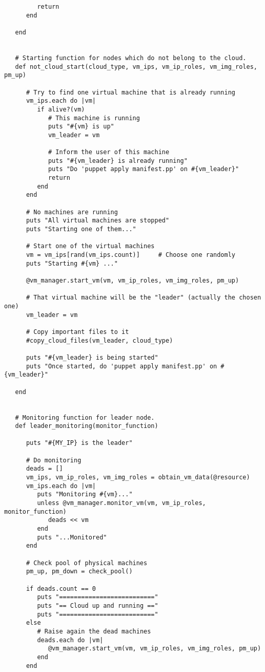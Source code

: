 \begin{lstlisting}
         return
      end

   end


   # Starting function for nodes which do not belong to the cloud.
   def not_cloud_start(cloud_type, vm_ips, vm_ip_roles, vm_img_roles, pm_up)
      
      # Try to find one virtual machine that is already running
      vm_ips.each do |vm|
         if alive?(vm)
            # This machine is running
            puts "#{vm} is up"
            vm_leader = vm

            # Inform the user of this machine
            puts "#{vm_leader} is already running"
            puts "Do 'puppet apply manifest.pp' on #{vm_leader}"
            return
         end
      end
      
      # No machines are running
      puts "All virtual machines are stopped"
      puts "Starting one of them..."
   
      # Start one of the virtual machines
      vm = vm_ips[rand(vm_ips.count)]     # Choose one randomly
      puts "Starting #{vm} ..."
      
      @vm_manager.start_vm(vm, vm_ip_roles, vm_img_roles, pm_up)
      
      # That virtual machine will be the "leader" (actually the chosen one)
      vm_leader = vm
      
      # Copy important files to it
      #copy_cloud_files(vm_leader, cloud_type)
      
      puts "#{vm_leader} is being started"
      puts "Once started, do 'puppet apply manifest.pp' on #{vm_leader}"

   end


   # Monitoring function for leader node.
   def leader_monitoring(monitor_function)

      puts "#{MY_IP} is the leader"
      
      # Do monitoring
      deads = []
      vm_ips, vm_ip_roles, vm_img_roles = obtain_vm_data(@resource)
      vm_ips.each do |vm|
         puts "Monitoring #{vm}..."
         unless @vm_manager.monitor_vm(vm, vm_ip_roles, monitor_function)
            deads << vm
         end
         puts "...Monitored"
      end
      
      # Check pool of physical machines
      pm_up, pm_down = check_pool()
      
      if deads.count == 0
         puts "=========================="
         puts "== Cloud up and running =="
         puts "=========================="
      else
         # Raise again the dead machines
         deads.each do |vm|
            @vm_manager.start_vm(vm, vm_ip_roles, vm_img_roles, pm_up)
         end
      end
               

\end{lstlisting}
